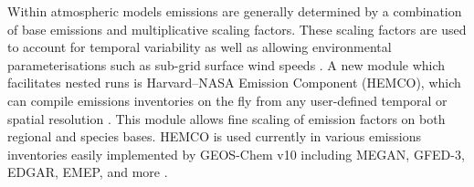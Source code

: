 Within atmospheric models emissions are generally determined by a combination of base emissions and multiplicative scaling factors. 
These scaling factors are used to account for temporal variability as well as allowing environmental parameterisations such as sub-grid surface wind speeds \cite{Ridley_2013,Zender_2003}.
A new module which facilitates nested runs is Harvard–NASA Emission Component (HEMCO), which can compile emissions inventories on the fly from any user-defined temporal or spatial resolution \cite{Keller_2014}.
This module allows fine scaling of emission factors on both regional and species bases.
HEMCO is used currently in various emissions inventories easily implemented by GEOS-Chem v10 including MEGAN, GFED-3, EDGAR, EMEP, and more \cite{Keller_2014}.
  
  
  
  
  